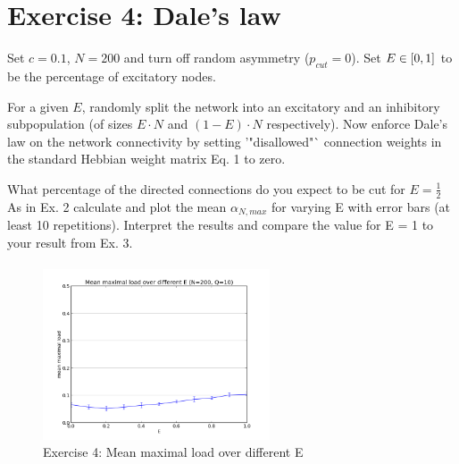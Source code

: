 \section{Exercise 4: Dale's law}

\begin{itshape}
\small
Set $c=0.1$, $N = 200$ and turn off random asymmetry ($p_{cut} = 0$). Set $E \in \left[0, 1\right]$ to be the percentage of excitatory nodes.

For a given $E$, randomly split the network into an excitatory and an inhibitory subpopulation (of sizes $E \cdot N$ and $(1 - E) \cdot N$ respectively). Now enforce Dale's law on the network connectivity by setting '"disallowed"` connection weights in the standard Hebbian weight matrix Eq. 1 to zero.

What percentage of the directed connections do you expect to be cut for $E = \frac{1}{2}$
As in Ex. 2 calculate and plot the mean $\alpha_{N,max}$ for varying E with error bars (at least 10 repetitions). Interpret the results and compare the value for E = 1 to your result from Ex. 3.
\end{itshape}

\paragraph*{}

\begin{figure}
  \vspace{-20pt}
  \begin{center}
    \includegraphics[width=0.6\textwidth]{dat/ex4-mean_max_load-N200-Q10-C95.png}
  \end{center}
  \vspace{-20pt}
  \caption{Exercise 4: Mean maximal load over different E}
  \label{fig: Question 1.3}
  \vspace{-10pt}
\end{figure}



